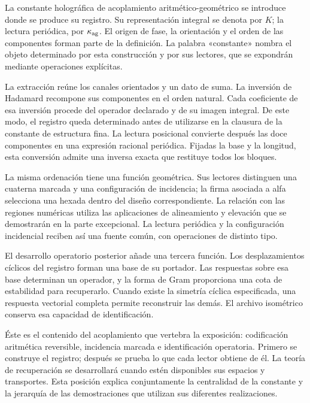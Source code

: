 
La constante holográfica de acoplamiento aritmético-geométrico se introduce
donde se produce su registro. Su representación integral se denota por
\(K\); la lectura periódica, por \(\kappa_{\rm ag}\). El origen de
fase, la orientación y el orden de las componentes forman parte de la
definición. La palabra «constante» nombra el objeto determinado por esta
construcción y por sus lectores, que se expondrán mediante operaciones
explícitas.

La extracción reúne los canales orientados y un dato de suma. La inversión
de Hadamard recompone sus componentes en el orden natural. Cada
coeficiente de esa inversión procede del operador declarado y de su
imagen integral. De este modo, el registro queda determinado antes de
utilizarse en la clausura de la constante de estructura fina. La lectura
posicional convierte después las doce componentes en una expresión
racional periódica. Fijadas la base y la longitud, esta conversión admite
una inversa exacta que restituye todos los bloques.

La misma ordenación tiene una función geométrica. Sus lectores distinguen
una cuaterna marcada y una configuración de incidencia; la firma asociada
a alfa selecciona una hexada dentro del diseño correspondiente. La
relación con las regiones numéricas utiliza las aplicaciones de
alineamiento y elevación que se demostrarán en la parte excepcional.
La lectura periódica y la configuración incidencial reciben así una
fuente común, con operaciones de distinto tipo.

El desarrollo operatorio posterior añade una tercera función. Los
desplazamientos cíclicos del registro forman una base de su portador. Las
respuestas sobre esa base determinan un operador, y la forma de Gram
proporciona una cota de estabilidad para recuperarlo. Cuando existe la
simetría cíclica especificada, una respuesta vectorial completa permite
reconstruir las demás. El archivo isométrico conserva esa capacidad de
identificación.

Éste es el contenido del acoplamiento que vertebra la exposición:
codificación aritmética reversible, incidencia marcada e identificación
operatoria. Primero se construye el registro; después se prueba lo que
cada lector obtiene de él. La teoría de recuperación se desarrollará
cuando estén disponibles sus espacios y transportes. Esta posición
explica conjuntamente la centralidad de la constante y la jerarquía de
las demostraciones que utilizan sus diferentes realizaciones.

